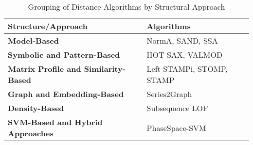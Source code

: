 \begin{table}[h!]
\centering
\caption{Grouping of Distance Algorithms by Structural Approach}
\label{tab:distance_algos_structures}
\begin{tabular}{ll}
\hline
\textbf{Structure/Approach} & \textbf{Algorithms} \\ \hline
\textbf{Model-Based} & NormA, SAND, SSA \\ 
\textbf{Symbolic and Pattern-Based} & HOT SAX, VALMOD \\
\textbf{Matrix Profile and Similarity-Based} & Left STAMPi, STOMP, STAMP \\
\textbf{Graph and Embedding-Based} & Series2Graph \\ 
\textbf{Density-Based} & Subsequence LOF \\ 
\textbf{SVM-Based and Hybrid Approaches} & PhaseSpace-SVM \\ \hline
\end{tabular}
\end{table}
